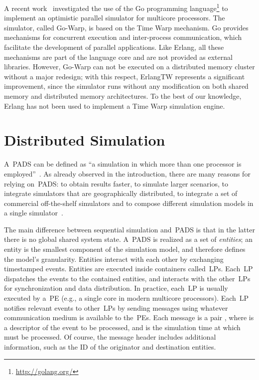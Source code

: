 \documentclass{sigplanconf}
\begin{document}
A recent work~\cite{gda12} investigated the use of the Go programming
language\footnote{\url{http://golang.org/}} to implement an optimistic
parallel simulator for multicore processors. The simulator, called
Go-Warp, is based on the Time Warp mechanism. Go provides mechanisms
for concurrent execution and inter-process communication, which
facilitate the development of parallel applications. Like Erlang, all
these mechanisms are part of the language core and are not provided as
external libraries. However, Go-Warp can not be executed on a
distributed memory cluster without a major redesign; with this
respect, ErlangTW represents a significant improvement, since the
simulator runs without any modification on both shared memory and
distributed memory architectures. To the best of our knowledge, Erlang
has not been used to implement a Time Warp simulation engine.


\section{Distributed Simulation}\label{sec:tw}

A~\acf{PADS} can be defined as ``a simulation in which more than one
processor is employed''~\cite{perumalla2007}. As already observed in
the introduction, there are many reasons for relying on~\ac{PADS}: to
obtain results faster, to simulate larger scenarios, to integrate
simulators that are geographically distributed, to integrate a set of
commercial off-the-shelf simulators and to compose different
simulation models in a single simulator~\cite{Fuj00}.

The main difference between sequential simulation and~\ac{PADS} is
that in the latter there is no global shared system state. A~\ac{PADS}
is realized as a set of \emph{entities}; an entity is the smallest
component of the simulation model, and therefore defines the model's
granularity. Entities interact with each other by exchanging
timestamped events. Entities are executed inside containers
called~\acp{LP}. Each~\ac{LP} dispatches the events to the contained
entities, and interacts with the other~\acp{LP} for synchronization
and data distribution. In practice, each~\ac{LP} is usually executed
by a~\ac{PE} (e.g., a single core in modern multicore processors).
Each~\ac{LP} notifies relevant events to other~\acp{LP} by sending
messages using whatever communication medium is available to
the~\acp{PE}. Each message is a pair , where  is a
descriptor of the event to be processed, and  is the simulation
time at which  must be processed. Of course, the message header
includes additional information, such as the ID of the originator and
destination entities.
\end{document}
